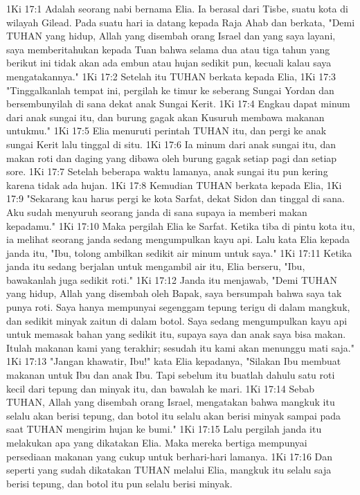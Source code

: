 1Ki 17:1  Adalah seorang nabi bernama Elia. Ia berasal dari Tisbe, suatu kota di wilayah Gilead. Pada suatu hari ia datang kepada Raja Ahab dan berkata, "Demi TUHAN yang hidup, Allah yang disembah orang Israel dan yang saya layani, saya memberitahukan kepada Tuan bahwa selama dua atau tiga tahun yang berikut ini tidak akan ada embun atau hujan sedikit pun, kecuali kalau saya mengatakannya."
1Ki 17:2  Setelah itu TUHAN berkata kepada Elia,
1Ki 17:3  "Tinggalkanlah tempat ini, pergilah ke timur ke seberang Sungai Yordan dan bersembunyilah di sana dekat anak Sungai Kerit.
1Ki 17:4  Engkau dapat minum dari anak sungai itu, dan burung gagak akan Kusuruh membawa makanan untukmu."
1Ki 17:5  Elia menuruti perintah TUHAN itu, dan pergi ke anak sungai Kerit lalu tinggal di situ.
1Ki 17:6  Ia minum dari anak sungai itu, dan makan roti dan daging yang dibawa oleh burung gagak setiap pagi dan setiap sore.
1Ki 17:7  Setelah beberapa waktu lamanya, anak sungai itu pun kering karena tidak ada hujan.
1Ki 17:8  Kemudian TUHAN berkata kepada Elia,
1Ki 17:9  "Sekarang kau harus pergi ke kota Sarfat, dekat Sidon dan tinggal di sana. Aku sudah menyuruh seorang janda di sana supaya ia memberi makan kepadamu."
1Ki 17:10  Maka pergilah Elia ke Sarfat. Ketika tiba di pintu kota itu, ia melihat seorang janda sedang mengumpulkan kayu api. Lalu kata Elia kepada janda itu, "Ibu, tolong ambilkan sedikit air minum untuk saya."
1Ki 17:11  Ketika janda itu sedang berjalan untuk mengambil air itu, Elia berseru, "Ibu, bawakanlah juga sedikit roti."
1Ki 17:12  Janda itu menjawab, "Demi TUHAN yang hidup, Allah yang disembah oleh Bapak, saya bersumpah bahwa saya tak punya roti. Saya hanya mempunyai segenggam tepung terigu di dalam mangkuk, dan sedikit minyak zaitun di dalam botol. Saya sedang mengumpulkan kayu api untuk memasak bahan yang sedikit itu, supaya saya dan anak saya bisa makan. Itulah makanan kami yang terakhir; sesudah itu kami akan menunggu mati saja."
1Ki 17:13  "Jangan khawatir, Ibu!" kata Elia kepadanya, "Silakan Ibu membuat makanan untuk Ibu dan anak Ibu. Tapi sebelum itu buatlah dahulu satu roti kecil dari tepung dan minyak itu, dan bawalah ke mari.
1Ki 17:14  Sebab TUHAN, Allah yang disembah orang Israel, mengatakan bahwa mangkuk itu selalu akan berisi tepung, dan botol itu selalu akan berisi minyak sampai pada saat TUHAN mengirim hujan ke bumi."
1Ki 17:15  Lalu pergilah janda itu melakukan apa yang dikatakan Elia. Maka mereka bertiga mempunyai persediaan makanan yang cukup untuk berhari-hari lamanya.
1Ki 17:16  Dan seperti yang sudah dikatakan TUHAN melalui Elia, mangkuk itu selalu saja berisi tepung, dan botol itu pun selalu berisi minyak.
